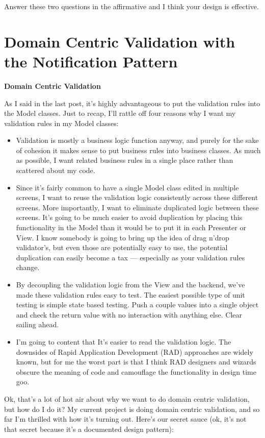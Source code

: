 \documentclass{article}
\begin{document}
{Answer these two questions in the affirmative and I think your design is effective.

\section{ Domain Centric Validation with the Notification Pattern } 

\Large {\textbf{Domain Centric Validation}}

As I said in the last post, it's highly advantageous to put the validation rules into the Model classes.  Just to recap, I'll rattle off four reasons why I want my validation rules in my Model classes:

\begin{itemize}
    \item  Validation is mostly a business logic function anyway, and purely for the sake of cohesion it makes sense to put business rules into business classes.  As much as possible, I want related business rules in a single place rather than scattered about my code.
    \item  Since it's fairly common to have a single Model class edited in multiple screens, I want to reuse the validation logic consistently across these different screens.  More importantly, I want to eliminate duplicated logic between these screens.  It's going to be much easier to avoid duplication by placing this functionality in the Model than it would be to put it in each Presenter or View.  I know somebody is going to bring up the idea of drag n'drop validator's, but even those are potentially easy to use, the potential duplication can easily become a tax — especially as your validation rules change.
    \item  By decoupling the validation logic from the View and the backend, we've made these validation rules easy to test.  The easiest possible type of unit testing is simple state based testing.  Push a couple values into a single object and check the return value with no interaction with anything else.  Clear sailing ahead.
    \item  I'm going to content that It's easier to read the validation logic.  The downsides of Rapid Application Development (RAD) approaches are widely known, but for me the worst part is that I think RAD designers and wizards obscure the meaning of code and camouflage the functionality in design time goo.
\end{itemize}	

Ok, that's a lot of hot air about why we want to do domain centric validation, but how do I do it?  My current project is doing domain centric validation, and so far I'm thrilled with how it's turning out.  Here's our secret sauce (ok, it's not that secret because it's a documented design pattern):

}
\end{document}

